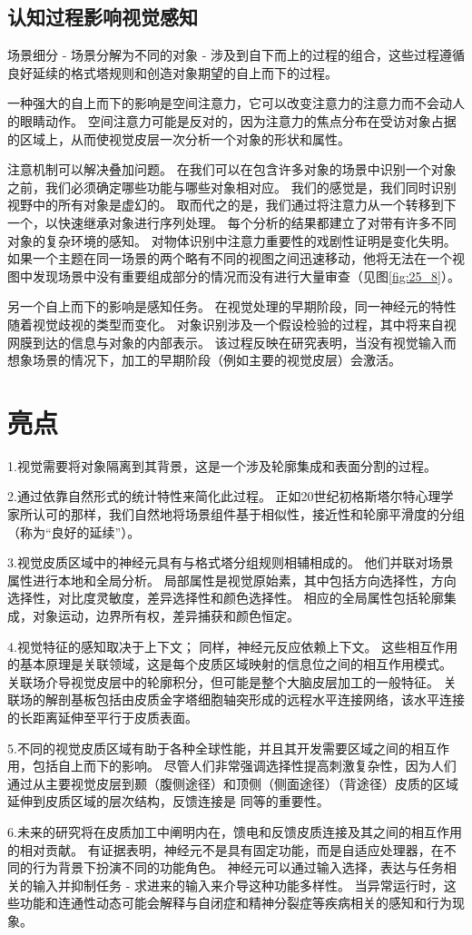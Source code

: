 \subsection{认知过程影响视觉感知}
场景细分 - 场景分解为不同的对象 - 涉及到自下而上的过程的组合，这些过程遵循良好延续的格式塔规则和创造对象期望的自上而下的过程。


一种强大的自上而下的影响是空间注意力，它可以改变注意力的注意力而不会动人的眼睛动作。
空间注意力可能是反对的，因为注意力的焦点分布在受访对象占据的区域上，从而使视觉皮层一次分析一个对象的形状和属性。


注意机制可以解决叠加问题。
在我们可以在包含许多对象的场景中识别一个对象之前，我们必须确定哪些功能与哪些对象相对应。
我们的感觉是，我们同时识别视野中的所有对象是虚幻的。
取而代之的是，我们通过将注意力从一个转移到下一个，以快速继承对象进行序列处理。
每个分析的结果都建立了对带有许多不同对象的复杂环境的感知。
对物体识别中注意力重要性的戏剧性证明是变化失明。 
如果一个主题在同一场景的两个略有不同的视图之间迅速移动，他将无法在一个视图中发现场景中没有重要组成部分的情况而没有进行大量审查（见图\ref{fig:25_8}）。


另一个自上而下的影响是感知任务。
在视觉处理的早期阶段，同一神经元的特性随着视觉歧视的类型而变化。
对象识别涉及一个假设检验的过程，其中将来自视网膜到达的信息与对象的内部表示。
该过程反映在研究表明，当没有视觉输入而想象场景的情况下，加工的早期阶段（例如主要的视觉皮层）会激活。



\section{亮点}
1.视觉需要将对象隔离到其背景，这是一个涉及轮廓集成和表面分割的过程。 


2.通过依靠自然形式的统计特性来简化此过程。
正如20世纪初格斯塔尔特心理学家所认可的那样，我们自然地将场景组件基于相似性，接近性和轮廓平滑度的分组（称为“良好的延续”）。 


3.视觉皮质区域中的神经元具有与格式塔分组规则相辅相成的。
他们并联对场景属性进行本地和全局分析。
局部属性是视觉原始素，其中包括方向选择性，方向选择性，对比度灵敏度，差异选择性和颜色选择性。
相应的全局属性包括轮廓集成，对象运动，边界所有权，差异捕获和颜色恒定。 


4.视觉特征的感知取决于上下文； 
同样，神经元反应依赖上下文。 
这些相互作用的基本原理是关联领域，这是每个皮质区域映射的信息位之间的相互作用模式。
关联场介导视觉皮层中的轮廓积分，但可能是整个大脑皮层加工的一般特征。
关联场的解剖基板包括由皮质金字塔细胞轴突形成的远程水平连接网络，该水平连接的长距离延伸至平行于皮质表面。 


5.不同的视觉皮质区域有助于各种全球性能，并且其开发需要区域之间的相互作用，包括自上而下的影响。
尽管人们非常强调选择性提高刺激复杂性，因为人们通过从主要视觉皮层到颞（腹侧途径）和顶侧（侧面途径）（背途径）皮质的区域延伸到皮质区域的层次结构，反馈连接是 同等的重要性。 


6.未来的研究将在皮质加工中阐明内在，馈电和反馈皮质连接及其之间的相互作用的相对贡献。 
有证据表明，神经元不是具有固定功能，而是自适应处理器，在不同的行为背景下扮演不同的功能角色。
神经元可以通过输入选择，表达与任务相关的输入并抑制任务 - 求进来的输入来介导这种功能多样性。
当异常运行时，这些功能和连通性动态可能会解释与自闭症和精神分裂症等疾病相关的感知和行为现象。

